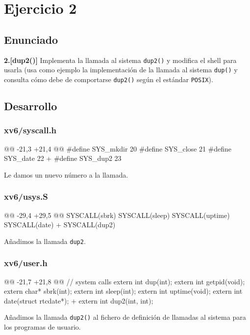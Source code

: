 \section{Ejercicio 2}
\subsection{Enunciado}
\begin{ejer}
    \textbf{2.[dup2()]} Implementa la llamada al sistema \texttt{dup2()} y modifica el shell
para usarla (usa como ejemplo la implementación de la llamada al sistema \texttt{dup()} y consulta cómo
debe de comportarse \texttt{dup2()} según el estándar \texttt{POSIX}).
\end{ejer}
\newpage
\subsection{Desarrollo}
\subsubsection{xv6/syscall.h}
\begin{listing}
@@ -21,3 +21,4 @@
    #define SYS_mkdir  20
    #define SYS_close  21
    #define SYS_date   22
+   #define SYS_dup2   23
\end{listing}
\par Le damos un nuevo número a la llamada.

\subsubsection{xv6/usys.S}
\begin{listing}
@@ -29,4 +29,5 @@
    SYSCALL(sbrk)
    SYSCALL(sleep)
    SYSCALL(uptime)
    SYSCALL(date)
+   SYSCALL(dup2)
\end{listing}
\par Añadimos la llamada \texttt{dup2}.

\subsubsection{xv6/user.h}
\begin{listing}
@@ -21,7 +21,8 @@ 
// system calls
    extern int dup(int);
    extern int getpid(void);
    extern char* sbrk(int);
    extern int sleep(int);
    extern int uptime(void);
    extern int date(struct rtcdate*);
+   extern int dup2(int, int);
\end{listing}
\par Añadimos la llamada \texttt{dup2()} al fichero de definición de llamadas 
al sistema para los programas de usuario.

